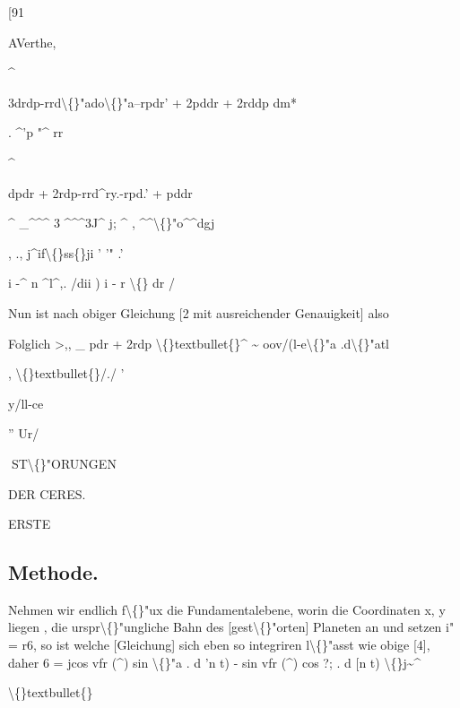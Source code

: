 \documentclass[10pt,a4paper]{article}
\begin{document}
[91

AVerthe,

\textasciicircum{}

3drdp-rrd\textbackslash\{\}"ado\textbackslash\{\}"a--rpdr' + 2pddr + 2rddp
dm*

. \textasciicircum{}'p
"\textasciicircum{} rr

\textasciicircum{}

dpdr + 2rdp-rrd\textasciicircum{}ry.-rpd.' + pddr

\textasciicircum{} \_\textasciicircum{}\textasciicircum{}\textasciicircum{} 3 \textasciicircum{}\textasciicircum{}\textasciicircum{}3J\textasciicircum{} j; \textasciicircum{} , \textasciicircum{}\textasciicircum{}\textbackslash\{\}"o\textasciicircum{}\textasciicircum{}dgj

, ., j\textasciicircum{}if\textbackslash\{\}ss\{\}ji
' '"
.'

i -\textasciicircum{} n \textasciicircum{}l\textasciicircum{},. /dii )
i - r
\textbackslash\{\} dr /

Nun ist nach obiger Gleichung [2 mit ausreichender Genauigkeit]
also

Folglich
>,, \_
pdr + 2rdp
\textbackslash\{\}textbullet\{\}\textasciicircum{} \textasciitilde{} oov/(l-e\textbackslash\{\}"a .d\textbackslash\{\}"atl

,
\textbackslash\{\}textbullet\{\}/./
'

y/ll-ce

'' Ur/

\newpage
ST\textbackslash\{\}"ORUNGEN

DER CERES.

ERSTE

\subsection*{Methode.}


Nehmen wir endlich f\textbackslash\{\}"ux die Fundamentalebene, worin die Coordinaten
x, y liegen , die urspr\textbackslash\{\}"ungliche Bahn des [gest\textbackslash\{\}"orten] Planeten an und setzen
i" = r6, so ist
welche [Gleichung] sich eben so integriren l\textbackslash\{\}"asst wie obige [4], daher
6 = jcos vfr (\textasciicircum{}) sin \textbackslash\{\}"a . d 'n t) - sin vfr (\textasciicircum{}) cos ?; . d [n t) \textbackslash\{\}j\textasciitilde{}\textasciicircum{}

\textbackslash\{\}textbullet\{\}
\end{document}
